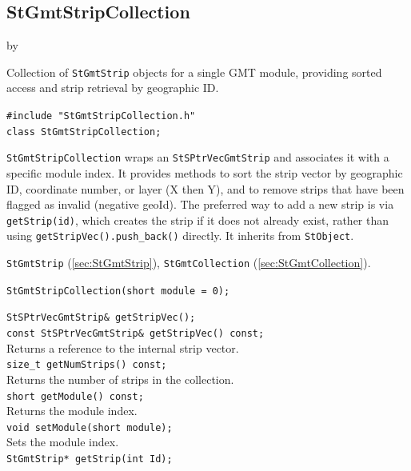 \documentclass[twoside]{article}
\newcommand{\entrylabel}[1]{\mbox{\textbf{{#1}}}\hfil}%
\newenvironment{entry}
{\begin{list}{}%
    {\renewcommand{\makelabel}{\entrylabel}%
     \setlength{\labelwidth}{90pt}%
     \setlength{\leftmargin}{\labelwidth}
     \advance\leftmargin by \labelsep%
      }%
    }%
  {\end{list}}
\newcommand{\Entrylabel}[1]%
{\raisebox{0pt}[1ex][0pt]{\makebox[\labelwidth][l]%
    {\parbox[t]{\labelwidth}{\hspace{0pt}\textbf{{#1}}}}}}
\newenvironment{Entry}%
{\renewcommand{\entrylabel}{\Entrylabel}\begin{entry}}%
  {\end{entry}}
\begin{document}
\subsection{StGmtStripCollection}
\label{sec:StGmtStripCollection}
\begin{Entry}
\item[Summary] Collection of \texttt{StGmtStrip} objects for a single GMT module,
    providing sorted access and strip retrieval by geographic ID.
\item[Synopsis]
    \verb+#include "StGmtStripCollection.h"+\\
    \verb+class StGmtStripCollection;+\\
\item[Description]
    \texttt{StGmtStripCollection} wraps an \texttt{StSPtrVecGmtStrip} and
    associates it with a specific module index.  It provides methods to sort
    the strip vector by geographic ID, coordinate number, or layer (X then Y),
    and to remove strips that have been flagged as invalid (negative geoId).
    The preferred way to add a new strip is via \texttt{getStrip(id)}, which
    creates the strip if it does not already exist, rather than using
    \texttt{getStripVec().push\_back()} directly.
    It inherits from \texttt{StObject}.
\item[Related Classes]
    \texttt{StGmtStrip} (\ref{sec:StGmtStrip}),
    \texttt{StGmtCollection} (\ref{sec:StGmtCollection}).
\item[Public\\ Constructors]
    \verb+StGmtStripCollection(short module = 0);+\\
\item[Public Member\\ Functions]
    \verb+StSPtrVecGmtStrip& getStripVec();+\\
    \verb+const StSPtrVecGmtStrip& getStripVec() const;+\\
    Returns a reference to the internal strip vector.\\
    \verb+size_t getNumStrips() const;+\\
    Returns the number of strips in the collection.\\
    \verb+short getModule() const;+\\
    Returns the module index.\\
    \verb+void setModule(short module);+\\
    Sets the module index.\\
    \verb+StGmtStrip* getStrip(int Id);+\\

\end{Entry}
\end{document}
